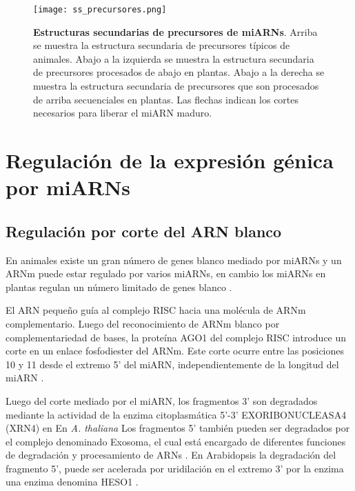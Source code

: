 \begin{figure}[htbp!] 
	\centering    
	\texttt{[image: ss\_precursores.png]}
	\caption[Estructuras  de precursores de miARNs]{
		\textbf{Estructuras secundarias de precursores de miARNs}.
        Arriba se muestra la estructura secundaria de precursores típicos de animales.
        Abajo a la izquierda se muestra la estructura secundaria de precursores procesados de abajo en plantas.
        Abajo a la derecha se muestra la estructura secundaria de precursores que son procesados de arriba secuenciales en plantas.
        Las flechas indican los cortes necesarios para liberar el miARN maduro.
    }
	\label{fig:ss_precursores}
\end{figure}

\section{Regulación de la expresión génica por miARNs}

\subsection{Regulación por corte del ARN blanco}

En animales existe un gran número de genes blanco mediado por miARNs y un ARNm puede estar regulado por varios miARNs, en cambio los miARNs en plantas regulan un número limitado de genes blanco \citep{Voinnet2009669}.

El ARN pequeño guía al complejo RISC hacia una molécula de ARNm complementario. 
Luego del reconocimiento de ARNm blanco por complementariedad de bases, la proteína AGO1 del complejo RISC introduce un corte en un enlace fosfodiester del ARNm.
Este corte ocurre entre las posiciones 10 y 11 desde el extremo 5' del miARN, independientemente de la longitud del miARN \citep{Mallory2004,Llave2002,pmid12931144,Xie2003,pmid15057819}.

Luego del corte mediado por el miARN, los fragmentos 3' son degradados  mediante la actividad de la enzima citoplasmática 5'-3' EXORIBONUCLEASA4 (XRN4) en En \textit{A. thaliana}  \citep{pmid15260969}
Los fragmentos 5' también pueden ser degradados por el complejo denominado Exosoma, el cual está encargado de diferentes funciones de degradación y procesamiento de ARNs \citep{pmid18160042}.
En Arabidopsis la degradación del fragmento 5', puede ser acelerada por uridilación en el extremo 3' por la enzima una enzima denomina HESO1 \citep{pmid24733911}.

